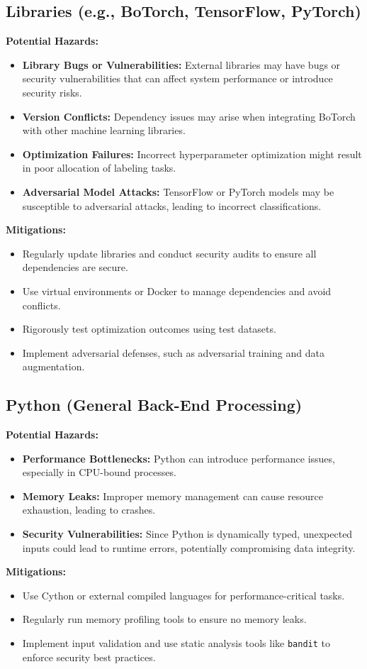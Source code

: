 \documentclass{article}
\begin{document}
\subsection{Libraries (e.g., BoTorch, TensorFlow, PyTorch)}
\textbf{Potential Hazards:}
\begin{itemize}
    \item \textbf{Library Bugs or Vulnerabilities:} External libraries may have bugs or security vulnerabilities that can affect system performance or introduce security risks.
    \item \textbf{Version Conflicts:} Dependency issues may arise when integrating BoTorch with other machine learning libraries.
    \item \textbf{Optimization Failures:} Incorrect hyperparameter optimization might result in poor allocation of labeling tasks.
    \item \textbf{Adversarial Model Attacks:} TensorFlow or PyTorch models may be susceptible to adversarial attacks, leading to incorrect classifications.
\end{itemize}
\textbf{Mitigations:}
\begin{itemize}
    \item Regularly update libraries and conduct security audits to ensure all dependencies are secure.
    \item Use virtual environments or Docker to manage dependencies and avoid conflicts.
    \item Rigorously test optimization outcomes using test datasets.
    \item Implement adversarial defenses, such as adversarial training and data augmentation.
\end{itemize}

\subsection{Python (General Back-End Processing)}
\textbf{Potential Hazards:}
\begin{itemize}
    \item \textbf{Performance Bottlenecks:} Python can introduce performance issues, especially in CPU-bound processes.
    \item \textbf{Memory Leaks:} Improper memory management can cause resource exhaustion, leading to crashes.
    \item \textbf{Security Vulnerabilities:} Since Python is dynamically typed, unexpected inputs could lead to runtime errors, potentially compromising data integrity.
\end{itemize}
\textbf{Mitigations:}
\begin{itemize}
    \item Use Cython or external compiled languages for performance-critical tasks.
    \item Regularly run memory profiling tools to ensure no memory leaks.
    \item Implement input validation and use static analysis tools like \texttt{bandit} to enforce security best practices.
\end{itemize}
\end{document}
